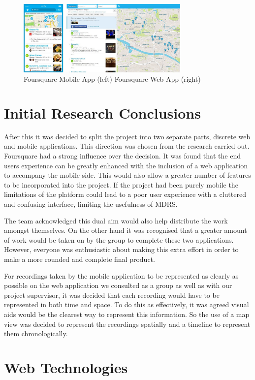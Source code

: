 \documentclass{l3proj}
\begin{document}
\begin{figure}[ht!]
  \centering
\includegraphics[width=0.75\textwidth]{images/foursquare.jpg}
\caption{Foursquare Mobile App (left) Foursquare Web App (right)}
\end{figure}

\section{Initial Research Conclusions}

After this it was decided to split the project into two separate parts, discrete web and mobile applications. This direction was chosen from the research carried out. Foursquare had a strong influence over the decision. It was found that the end users experience can be greatly enhanced with the inclusion of a web application to accompany the mobile side. This would also allow a greater number of features to be incorporated into the project. If the project had been purely mobile the limitations of the platform could lead to a poor user experience with a cluttered and confusing interface, limiting the usefulness of MDRS.

The team acknowledged this dual aim would also help distribute the work amongst themselves. On the other hand it was recognised that a greater amount of work would be taken on by the group to complete these two applications. However, everyone was enthusiastic about making this extra effort in order to make a more rounded and complete final product.

For recordings taken by the mobile application to be represented as clearly as possible on the web application we consulted as a group as well as with our project supervisor, it was decided that each recording would have to be represented in both time and space. To do this as effectively, it was agreed visual aids would be the clearest way to represent this information. So the use of a map view was decided to represent the recordings spatially and a timeline to represent them chronologically.

\section{Web Technologies}
\end{document}
